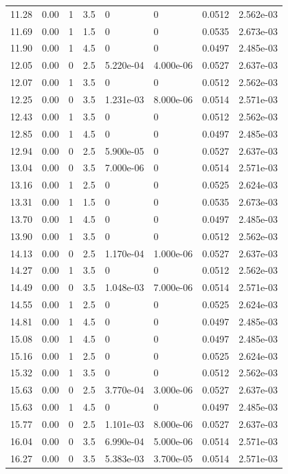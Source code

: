 \documentclass[preview]{standalone}
\begin{document}
{{{\begin{tabular}{L{1.2cm}C{1.2cm} C{0.3cm}C{0.5cm} C{1.4cm}C{1.4cm} C{1.4cm}C{1.4cm}}
  11.28  &  0.00  & 1     & 3.5 &  0  & 0  & 0.0512 &  2.562e-03   \\ 
  11.69  &  0.00  & 1     & 1.5 &  0  & 0  & 0.0535 &  2.673e-03   \\ 
  11.90  &  0.00  & 1     & 4.5 &  0  & 0  & 0.0497 &  2.485e-03   \\ 
  12.05  &  0.00  & 0     & 2.5 &  5.220e-04  & 4.000e-06  & 0.0527 &  2.637e-03   \\ 
  12.07  &  0.00  & 1     & 3.5 &  0  & 0  & 0.0512 &  2.562e-03   \\ 
  12.25  &  0.00  & 0     & 3.5 &  1.231e-03  & 8.000e-06  & 0.0514 &  2.571e-03   \\ 
  12.43  &  0.00  & 1     & 3.5 &  0  & 0  & 0.0512 &  2.562e-03   \\ 
  12.85  &  0.00  & 1     & 4.5 &  0  & 0  & 0.0497 &  2.485e-03   \\ 
  12.94  &  0.00  & 0     & 2.5 &  5.900e-05  & 0  & 0.0527 &  2.637e-03   \\ 
  13.04  &  0.00  & 0     & 3.5 &  7.000e-06  & 0  & 0.0514 &  2.571e-03   \\ 
  13.16  &  0.00  & 1     & 2.5 &  0  & 0  & 0.0525 &  2.624e-03   \\ 
  13.31  &  0.00  & 1     & 1.5 &  0  & 0  & 0.0535 &  2.673e-03   \\ 
  13.70  &  0.00  & 1     & 4.5 &  0  & 0  & 0.0497 &  2.485e-03   \\ 
  13.90  &  0.00  & 1     & 3.5 &  0  & 0  & 0.0512 &  2.562e-03   \\ 
  14.13  &  0.00  & 0     & 2.5 &  1.170e-04  & 1.000e-06  & 0.0527 &  2.637e-03   \\ 
  14.27  &  0.00  & 1     & 3.5 &  0  & 0  & 0.0512 &  2.562e-03   \\ 
  14.49  &  0.00  & 0     & 3.5 &  1.048e-03  & 7.000e-06  & 0.0514 &  2.571e-03   \\ 
  14.55  &  0.00  & 1     & 2.5 &  0  & 0  & 0.0525 &  2.624e-03   \\ 
  14.81  &  0.00  & 1     & 4.5 &  0  & 0  & 0.0497 &  2.485e-03   \\ 
  15.08  &  0.00  & 1     & 4.5 &  0  & 0  & 0.0497 &  2.485e-03   \\ 
  15.16  &  0.00  & 1     & 2.5 &  0  & 0  & 0.0525 &  2.624e-03   \\ 
  15.32  &  0.00  & 1     & 3.5 &  0  & 0  & 0.0512 &  2.562e-03   \\ 
  15.63  &  0.00  & 0     & 2.5 &  3.770e-04  & 3.000e-06  & 0.0527 &  2.637e-03   \\ 
  15.63  &  0.00  & 1     & 4.5 &  0  & 0  & 0.0497 &  2.485e-03   \\ 
  15.77  &  0.00  & 0     & 2.5 &  1.101e-03  & 8.000e-06  & 0.0527 &  2.637e-03   \\ 
  16.04  &  0.00  & 0     & 3.5 &  6.990e-04  & 5.000e-06  & 0.0514 &  2.571e-03   \\ 
  16.27  &  0.00  & 0     & 3.5 &  5.383e-03  & 3.700e-05  & 0.0514 &  2.571e-03   \\ 
\hline 
\end{tabular} 

}}}
\end{document}
